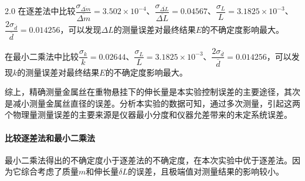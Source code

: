 \documentclass[a4paper,fontset=windows]{ctexart}
\begin{document}
    \begin{spacing}{2.0}
    在逐差法中比较$\dfrac{\sigma_{\overline{\Delta m}}}{\overline{\Delta m}} = 3.502\times10^{-4}$、$\dfrac{\sigma_{\overline{\Delta L}}}{\overline{\Delta L}} = 0.04567$、$\dfrac{\sigma_L}{L} = 3.1825\times10^{-3}$、$\dfrac{2\sigma_{\overline{d}}}{\overline{d}} = 0.014256$，可以发现$\Delta L$的测量误差对最终结果$E$的不确定度影响最大。

    在最小二乘法中比较$\dfrac{\sigma_k}{k} = 0.02644$、$\dfrac{\sigma_L}{L} = 3.1825\times10^{-3}$、$\dfrac{2\sigma_{\overline{d}}}{\overline{d}} = 0.014256$，可以发现$k$的测量误差对最终结果$E$的不确定度影响最大。
    \end{spacing}
    综上，精确测量金属丝在重物悬挂下的伸长量是本实验控制误差的主要途径，其次是减小测量金属丝直径的误差。分析本实验的数据可知，通过多次测量，引起这两个物理量测量误差的主要来源是仪器最小分度和仪器允差带来的未定系统误差。

    \paragraph*{比较逐差法和最小二乘法} 最小二乘法得出的不确定度小于逐差法的不确定度，在本次实验中优于逐差法。因为它综合考虑了质量$m$和伸长量$\delta L$的误差，且极端值对测量结果的影响较小。
\end{document}
